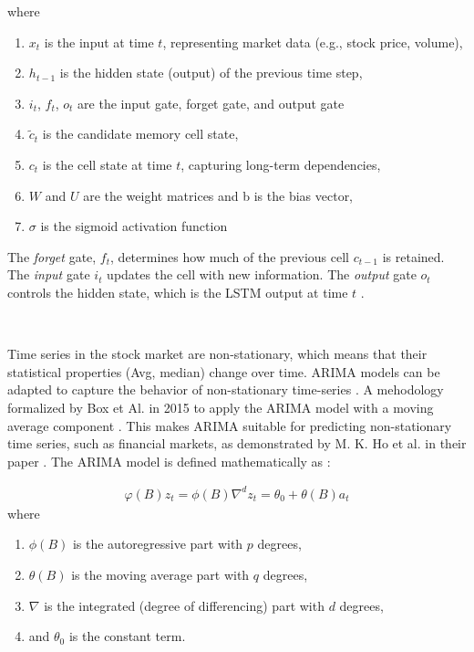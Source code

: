 \documentclass[12pt, letterpaper]{article}
\begin{document}
where

\begin{enumerate}[label=-]
    \item $x_t$ is the input at time $t$, representing market data (e.g., stock price, volume),
    \item $h_{t-1}$ is the hidden state (output) of the previous time step,
    \item $i_t$, $f_t$, $o_t$ are the input gate, forget gate, and output gate
    \item $\tilde{c}_t$ is the candidate memory cell state,
    \item $c_t$ is the cell state at time $t$, capturing long-term dependencies,
    \item $W$ and $U$ are the weight matrices and b is the bias vector,
    \item $\sigma$ is the sigmoid activation function
\end{enumerate}

The \textit{forget} gate, $f_t$, determines how much of the previous cell $c_{t-1}$ is retained. The \textit{input} gate $i_t$ updates the cell with new information. The \textit{output} gate $o_t$ controls the hidden state, which is the LSTM output at time $t$ \cite{hochreiter1997}.


    \
    
    Time series in the stock market are non-stationary, which means that their statistical properties (Avg, median) change over time. ARIMA models can be adapted to capture the behavior of non-stationary time-series \cite{ho2021}. A mehodology formalized by Box et Al. in 2015 to apply the ARIMA model with a moving average component \cite{box2015}.
    This makes ARIMA suitable for predicting non-stationary time series, such as financial markets, as demonstrated by M. K. Ho et al. in their paper \cite{ho2021}.
    The ARIMA model is defined mathematically as \cite{box2015}:
    {\small
    \begin{align*}
        \varphi (B) z_t = \phi (B)\nabla^d z_t = \theta_0 + \theta (B)a_t
    \end{align*}
    where
    \begin{enumerate}[label=-]
        \item $\phi(B)$ is the autoregressive part with $p$ degrees,
        \item $\theta (B)$ is the moving average part with $q$ degrees,
        \item $\nabla$ is the integrated (degree of differencing) part with $d$ degrees,
        \item and $\theta_0$ is the constant term.
    \end{enumerate}
    }
\end{document}
